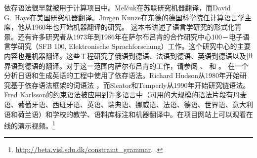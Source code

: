 依存语法很早就被用于计算项目中。Meľčuk在苏联研究机器翻译，而David G.\ Hays在美国研究机器翻译。Jürgen Kunze在东德的德国科学院任计算语言学主席，他从1960年也开始机器翻译的研究。 这本书讲述了语言学研究的形式化背景。还有许多研究者从1973年到1986年在萨尔布吕肯的合作研究中心100－电子语言学研究（SFB 100, Elektronische Sprachforschung）工作。这个研究中心的主要内容也是机器翻译。这些工程研究了俄语到德语、法语到德语、英语到德语以及世界语到德语的翻译。对于这一范围内萨尔布吕肯的工作，请参阅 、 和 。 \citet{MIF85a}在一个分析日语和生成英语的工程中使用了依存语法。Richard Hudson从1980年开始研究基于依存语法框架的词语法\indexwgc\citep{Hudson84a-u,Hudson2007a-u} ，而Sleator和Temperly从1990年开始研究链语法\citep{ST91a-u,GLS95a-u}。Fred Karlsson的约束语法\citeyearpar{Karlsson90a-u}被应用到许多语言中（可用的大规模的语法片段有丹麦语、葡萄牙语、西班牙语、英语、瑞典语、挪威语、法语、德语、世界语、意大利语和荷兰语）和学校的教学、语料库标注和机器翻译中。在项目网站上可以观看在线的演示视频。\footnote{%
  \url{http://beta.visl.sdu.dk/constraint_grammar}. .
}

